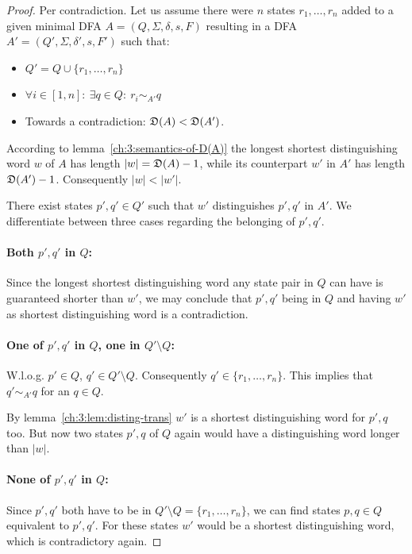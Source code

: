\begin{proof}
	Per contradiction. Let us assume there were $n$ states $r_1, \ldots, r_n$ added to a given minimal DFA $A = (Q, \Sigma, \delta, s, F)$ resulting in a DFA $A' = (Q', \Sigma, \delta', s, F')$ such that:
	\begin{itemize}
		\item $Q' = Q \cup \{ r_1, \ldots, r_n \}$
		\item $\forall i \in [1,n] \colon\ \exists q \in Q\colon\ r_i \sim_{A'} q$
		\item Towards a contradiction: $\mathfrak{D}(A) < \mathfrak{D}(A')$.
	\end{itemize}
    According to lemma~\ref{ch:3:semantics-of-D(A)} the longest shortest distinguishing word $w$ of $A$ has length $|w| = \mathfrak{D}(A) - 1$, while its counterpart $w'$ in $A'$ has length $\mathfrak{D}(A') - 1$. Consequently $|w| < |w'|$.
    
    There exist states $p',q' \in Q'$ such that $w'$ distinguishes $p',q'$ in $A'$. We differentiate between three cases regarding the belonging of $p',q'$.
    
    \paragraph*{Both $p',q'$ in $Q$:} Since the longest shortest distinguishing word any state pair in $Q$ can have is guaranteed shorter than $w'$, we may conclude that $p',q'$ being in $Q$ and having $w'$ as shortest distinguishing word is a contradiction. \lightning
    
    \paragraph*{One of $p',q'$ in $Q$, one in $Q'\setminus Q$:} W.l.o.g. $p' \in Q$, $q' \in Q'\setminus Q$. Consequently $q' \in \{r_1, \ldots, r_n\}$. This implies that $q' \sim_{A'} q$ for an $q \in Q$.
    
    By lemma~\ref{ch:3:lem:disting-trans} $w'$ is a shortest distinguishing word for $p',q$ too. But now two states $p',q$ of $Q$ again would have a distinguishing word longer than $|w|$. \lightning
        
    \paragraph*{None of $p',q'$ in $Q$:} Since $p',q'$ both have to be in $Q'\setminus Q = \{r_1, \ldots, r_n\}$, we can find states $p, q \in Q$ equivalent to $p',q'$. For these states $w'$ would be a shortest distinguishing word, which is contradictory again. \lightning 
\end{proof}

